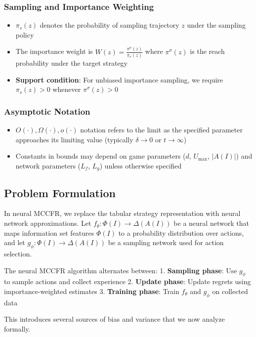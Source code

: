 \documentclass[12pt,a4paper]{article}
\begin{document}
\subsubsection{Sampling and Importance Weighting}
\begin{itemize}
\item $\pi_s(z)$ denotes the probability of sampling trajectory $z$ under the sampling policy
\item The importance weight is $W(z) = \frac{\pi^\sigma(z)}{\pi_s(z)}$ where $\pi^\sigma(z)$ is the reach probability under the target strategy
\item \textbf{Support condition}: For unbiased importance sampling, we require $\pi_s(z) > 0$ whenever $\pi^\sigma(z) > 0$
\end{itemize}

\subsubsection{Asymptotic Notation}
\begin{itemize}
\item $O(\cdot), \Omega(\cdot), o(\cdot)$ notation refers to the limit as the specified parameter approaches its limiting value (typically $\delta \to 0$ or $t \to \infty$)
\item Constants in bounds may depend on game parameters ($d$, $U_{\max}$, $|A(I)|$) and network parameters ($L_f$, $L_g$) unless otherwise specified
\end{itemize}

\subsection{Problem Formulation}

In neural MCCFR, we replace the tabular strategy representation with neural network approximations. Let $f_\theta: \Phi(I) \rightarrow \Delta(A(I))$ be a neural network that maps information set features $\Phi(I)$ to a probability distribution over actions, and let $g_\phi: \Phi(I) \rightarrow \Delta(A(I))$ be a sampling network used for action selection.

The neural MCCFR algorithm alternates between:
1. \textbf{Sampling phase}: Use $g_\phi$ to sample actions and collect experience
2. \textbf{Update phase}: Update regrets using importance-weighted estimates
3. \textbf{Training phase}: Train $f_\theta$ and $g_\phi$ on collected data

This introduces several sources of bias and variance that we now analyze formally.
\end{document}
